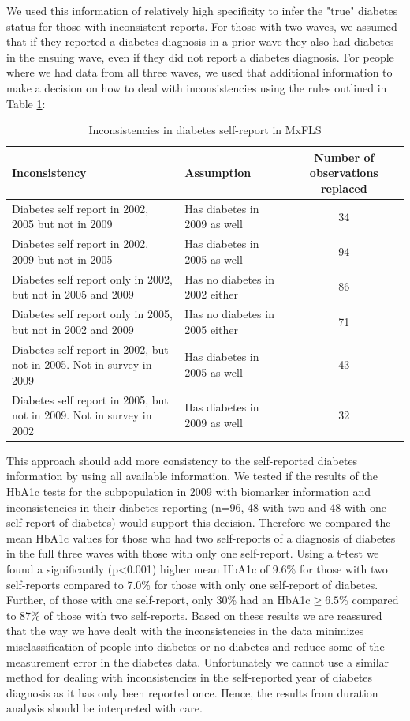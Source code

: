 \documentclass[12pt,english]{article}
\providecommand{\tabularnewline}{\\}
\begin{document}
{\begin{appendix}
We used this information of relatively high specificity to infer the "true" diabetes status for those with inconsistent reports. For those with two waves, we assumed that if they reported a diabetes diagnosis in a prior wave they also had diabetes in the ensuing wave, even if they did not report a diabetes diagnosis.
For people where we had data from all three waves, we used that additional information to make a decision on how to deal with inconsistencies using the rules outlined in Table \ref{tab:Inconsistencies}:

\begin{table}[h!]
\caption{\label{tab:Inconsistencies}Inconsistencies in diabetes self-report in MxFLS}
\begin{center}
\begin{adjustbox}{max width=\textwidth}
\begin{tabular}{llc}
\hline 
Inconsistency  & Assumption  & Number of observations replaced\tabularnewline
\hline 
Diabetes self report in 2002, 2005 but not in 2009  & Has diabetes in 2009 as well  & 34\tabularnewline
Diabetes self report in 2002, 2009 but not in 2005  & Has diabetes in 2005 as well  & 94\tabularnewline
Diabetes self report only in 2002, but not in 2005 and 2009  & Has no diabetes in 2002 either  & 86\tabularnewline
Diabetes self report only in 2005, but not in 2002 and 2009  & Has no diabetes in 2005 either  & 71\tabularnewline
Diabetes self report in 2002, but not in 2005. Not in survey in 2009  & Has diabetes in 2005 as well  & 43\tabularnewline
Diabetes self report in 2005, but not in 2009. Not in survey in 2002  & Has diabetes in 2009 as well  & 32\tabularnewline
\end{tabular}
\end{adjustbox}
\end{center}
\end{table}


This approach should add more consistency to the self-reported diabetes information by using all available information. We tested if the results of the \ac{HbA1c} tests for the subpopulation in 2009 with biomarker information and inconsistencies in their diabetes reporting (n=96, 48 with two and 48 with one self-report of diabetes) would support this decision. Therefore we compared the mean \ac{HbA1c} values for those who had two self-reports of a diagnosis of diabetes in the full three waves with those with only one self-report. Using a t-test we found a significantly (p<0.001) higher mean \ac{HbA1c} of 9.6\%
for those with two self-reports compared to 7.0\% for those with only one self-report of diabetes. Further, of those with one self-report, only 30\% had an \ac{HbA1c}$\geq6.5$\% compared to 87\% of those with two self-reports. Based on these results we are reassured that the way we have dealt with the inconsistencies in the data minimizes misclassification of people into diabetes or no-diabetes and reduce some of the measurement error in the diabetes data. Unfortunately we cannot use a similar method for dealing with inconsistencies in the self-reported year of diabetes diagnosis as it has only been reported once. Hence, the results from duration analysis should be interpreted with care.


\end{appendix}}
\end{document}
